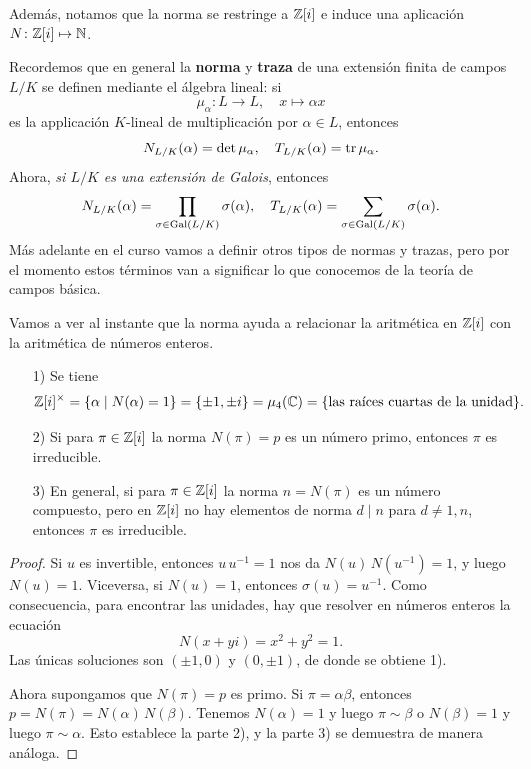 Además, notamos que la norma se restringe a $\mathbb{Z} [i]$ e induce una aplicación
$N\colon \mathbb{Z} [i] \mapsto \mathbb{N}$.

\begin{comentario}
  Recordemos que en general la \textbf{norma} y \textbf{traza} de una extensión
  finita de campos $L/K$ se definen mediante el álgebra lineal: si
  $$\mu_\alpha\colon L\to L, \quad x \mapsto \alpha x$$
  es la applicación $K$-lineal de multiplicación por $\alpha \in L$, entonces
  \[ N_{L/K} (\alpha) = \det \mu_\alpha, \quad
     T_{L/K} (\alpha) = \operatorname{tr}  \mu_\alpha. \]
  Ahora, \emph{si $L/K$ es una extensión de Galois}, entonces
  \[ N_{L/K} (\alpha) = \prod_{\sigma\in\operatorname{Gal} (L/K)} \sigma (\alpha), \quad
     T_{L/K} (\alpha) = \sum_{\sigma\in\operatorname{Gal} (L/K)} \sigma (\alpha). \]
  Más adelante en el curso vamos a definir otros tipos de normas y trazas,
  pero por el momento estos términos van a significar lo que conocemos
  de la teoría de campos básica.
\end{comentario}

Vamos a ver al instante que la norma ayuda a relacionar la aritmética en
$\mathbb{Z} [i]$ con la aritmética de números enteros.

\begin{lema}
  \begin{enumerate}
  \item[1)] Se tiene
    \[ \mathbb{Z} [i]^\times = \{ \alpha \mid N (\alpha) = 1 \}
           = \{ \pm 1, \pm i \}
           = \mu_4 (\mathbb{C})
           = \{ \text{las raíces cuartas de la unidad} \}. \]

  \item[2)] Si para $\pi \in \mathbb{Z} [i]$ la norma $N (\pi) = p$ es un número primo,
    entonces $\pi$ es irreducible.

  \item[3)] En general, si para $\pi \in \mathbb{Z} [i]$ la norma $n = N (\pi)$ es
    un número compuesto, pero en $\mathbb{Z} [i]$ no hay elementos de norma $d \mid n$
    para $d \ne 1, n$, entonces $\pi$ es irreducible.
  \end{enumerate}

  \begin{proof}
    Si $u$ es invertible, entonces $u\,u^{-1} = 1$ nos da
    $N (u)\,N (u^{-1}) = 1$, y luego $N (u) = 1$. Viceversa, si $N (u) = 1$,
    entonces $\sigma (u) = u^{-1}$. Como consecuencia, para encontrar las
    unidades, hay que resolver en números enteros la ecuación
    $$N (x + yi) = x^2 + y^2 = 1.$$
    Las únicas soluciones son $(\pm 1, 0)$ y $(0, \pm 1)$,
    de donde se obtiene 1).

    Ahora supongamos que $N (\pi) = p$ es primo. Si $\pi = \alpha\beta$,
    entonces $p = N (\pi) = N (\alpha)\,N (\beta)$. Tenemos $N (\alpha) = 1$
    y luego $\pi \sim \beta$ o $N (\beta) = 1$ y luego $\pi \sim \alpha$.
    Esto establece la parte 2), y la parte 3) se demuestra de manera análoga.
  \end{proof}
\end{lema}

